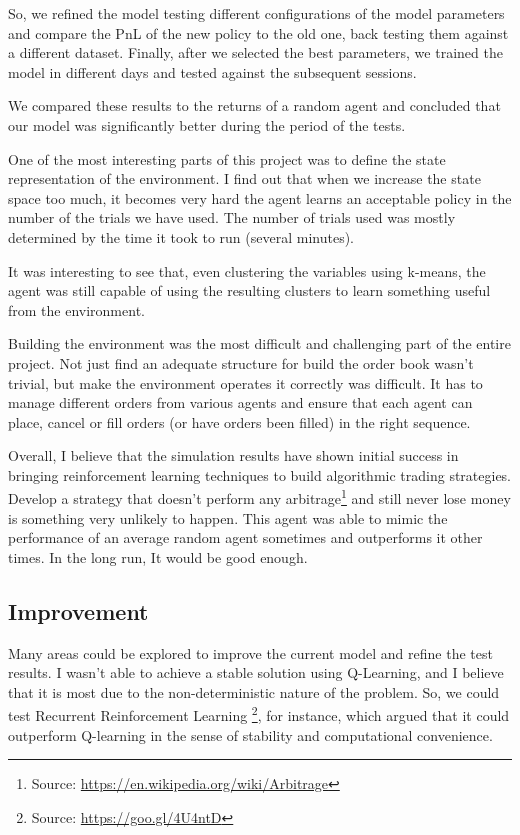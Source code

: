 \documentclass[a4paper]{article}
\begin{document}
So, we refined the model testing different configurations of the model parameters and compare the PnL of the new policy to the old one, back testing them against a different dataset. Finally, after we selected the best parameters, we trained the model in different days and tested against the subsequent sessions.

We compared these results to the returns of a random agent and concluded that our model was significantly better during the period of the tests.

One of the most interesting parts of this project was to define the state representation of the environment. I find out that when we increase the state space too much, it becomes very hard the agent learns an acceptable policy in the number of the trials we have used. The number of trials used was mostly determined by the time it took to run (several minutes).

It was interesting to see that, even clustering the variables using k-means, the agent was still capable of using the resulting clusters to learn something useful from the environment.

Building the environment was the most difficult and challenging part of the entire project. Not just find an adequate structure for build the order book wasn't trivial, but make the environment operates it correctly was difficult. It has to manage different orders from various agents and ensure that each agent can place, cancel or fill orders (or have orders been filled) in the right sequence.

Overall, I believe that the simulation results have shown initial success in bringing reinforcement learning techniques to build algorithmic trading strategies. Develop a strategy that doesn't perform any arbitrage\footnote{Source: \url{https://en.wikipedia.org/wiki/Arbitrage}} and still never lose money is something very unlikely to happen. This agent was able to mimic the performance of an average random agent sometimes and outperforms it other times. In the long run, It would be good enough.


\subsection{Improvement}

Many areas could be explored to improve the current model and refine the test results. I wasn't able to achieve a stable solution using Q-Learning, and I believe that it is most due to the non-deterministic nature of the problem. So, we could test Recurrent Reinforcement Learning \footnote{Source: \url{https://goo.gl/4U4ntD}}, for instance, which \cite{du1algorithm} argued that it could outperform Q-learning in the sense of stability and computational convenience.
\end{document}
